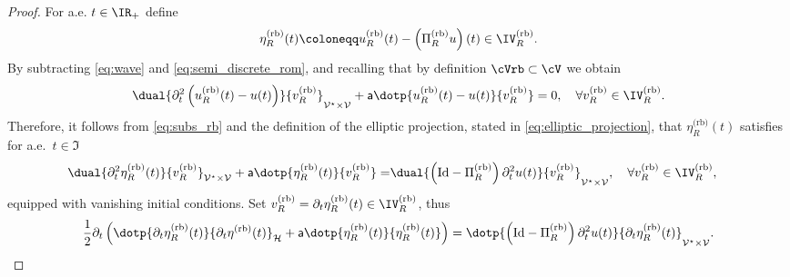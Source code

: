 \begin{proof}
For a.e. $t \in \IR_{+}$ define 
\begin{equation}\label{eq:def_eta}
	\eta^{\text{(rb)}}_R(t) 
	\coloneqq 
	u^{\normalfont\text{(rb)}}_R(t)
	   -
	\left(\Pi^{\text{(rb)}}_R u\right)(t)
	\in
	\IV^{\text{(rb)}}_R.
\end{equation} 
By subtracting \eqref{eq:wave} and \eqref{eq:semi_discrete_rom},
and recalling that by definition $\cVrb\subset\cV$ we obtain
\begin{equation}\label{eq:subs_rb}
	\dual{
		\partial^2_t
		\left(
			u^{\normalfont\text{(rb)}}_R(t)
			-
			u(t)
		\right)
	}{
		v^{\text{(rb)}}_R
	}_{\mathcal{V}^\star\times \mathcal{V}}	
	+
	\mathsf{a}
	\dotp{
		u^{\normalfont\text{(rb)}}_R(t)
		-
		u(t)
	}{
		v^{\text{(rb)}}_R
	}
	=
	0,
    \quad
    \forall v^{\text{(rb)}}_R\in \IV^{\text{(rb)}}_R.
\end{equation}
Therefore, it follows from \eqref{eq:subs_rb} and the definition
of the elliptic projection, stated in \eqref{eq:elliptic_projection}, that
$\eta^{\text{(rb)}}_R(t)$ satisfies
for a.e.~$t \in \mathfrak{I}$
\begin{equation}\label{eq:residual_eta}
\begin{aligned}
	\dual{	
		\partial^2_t
		\eta^{\text{(rb)}}_R(t)
	}{
		v^{\text{(rb)}}_R
	}_{\mathcal{V}^\star\times \mathcal{V}}	
    +
	\mathsf{a}
	\dotp{
		\eta^{\text{(rb)}}_R(t)
	}{
		v^{\text{(rb)}}_R
	}
	=
   	&
	\dual{
		\left(
			\text{Id}
			-
			\Pi^{\text{(rb)}}_R
		\right)
		\partial^2_t
		 u(t) 
	}{
		v^{\text{(rb)}}_R
	}_{\mathcal{V}^\star\times \mathcal{V}}	,	
    \quad
    \forall v^{\text{(rb)}}_R \in \IV^{\text{(rb)}}_R,
\end{aligned}
\end{equation}
equipped with vanishing initial conditions.
Set $v^{\text{(rb)}}_R = \partial_t \eta^{\text{(rb)}}_R(t) \in  \IV^{\text{(rb)}}_R$, thus
\begin{equation}
\begin{aligned}
    \frac{1}{2}
    \partial_t
    \left(
    	\dotp{	
    		\partial_t
    		\eta^{\text{(rb)}}_R(t)
    	}{
    	   \partial_t 
           \eta^{\text{(rb)}}(t)
    	}_{\mathcal{H}}
        +
        \mathsf{a}
        \dotp{
            \eta^{\text{(rb)}}_R(t)
        }{
            \eta^{\text{(rb)}}_R(t)
        }
    \right)
    =
    \dotp{
		\left(
			\text{Id}
			-
			\Pi^{\text{(rb)}}_R
		\right)
		\partial^2_t
		 u(t) 
	}{
		\partial_t \eta^{\text{(rb)}}_R(t)
	}_{\mathcal{V}^\star\times \mathcal{V}}.
\end{aligned}

\end{equation}
\end{proof}
